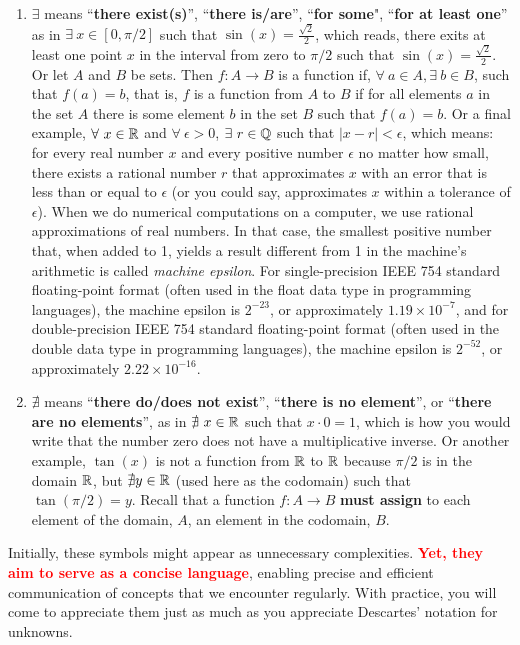 \begin{tcolorbox}[colback = mylightblue, title=\textbf{(Optional Read:) Symbology of Mathematics:}, breakable]
\begin{definition}
\begin{enumerate}
        \item  $\exists$ means ``\textbf{there exist(s)}'', ``\textbf{there is/are}'', ``\textbf{for some}", ``\textbf{for at least one}'' as in $\exists ~x\in [0, \pi/2]$ such that $\sin(x) = \frac{\sqrt{2}}{2}$, which reads, there exits at least one point $x$ in the interval from zero to $\pi/2$ such that $\sin(x) = \frac{\sqrt{2}}{2}$. Or let $A$ and $B$ be sets. Then $f:A \to B$ is a function if, $\forall ~a \in A, \exists~b \in B$, such that $f(a) = b$, that is, $f$ is a function from $A$ to $B$ if for all elements $a$ in the set $A$ there is some element $b$ in the set $ B$ such that $f(a) = b$. Or a final example, $\forall~x \in \mathbb R$ and $\forall~\epsilon > 0$, $\exists~ r \in \mathbb Q$ such that $|x-r| < \epsilon$, which means: for every real number $x$ and every positive number $\epsilon$ no matter how small, there exists a rational number $r$ that approximates $x$ with an error that is less than or equal to $\epsilon$ (or you could say, approximates $x$ within a tolerance of $\epsilon$). When we do numerical computations on a computer, we use rational approximations of real numbers. In that case, the smallest positive number that, when added to 1, yields a result different from 1 in the machine's arithmetic is called \textit{machine epsilon}. For single-precision IEEE 754 standard floating-point format (often used in the float data type in programming languages), the machine epsilon is $ 2^{-23}$, or approximately $1.19 \times 10^{-7}$, and for double-precision IEEE 754 standard floating-point format (often used in the double data type in programming languages), the machine epsilon is $ 2^{-52}$, or approximately $2.22 \times 10^{-16}$.

        \item $\nexists$ means ``\textbf{there do/does not exist}'', ``\textbf{there is no element}'', or ``\textbf{there are no elements}'', as in $\nexists ~x\in \mathbb R$ such that $x \cdot 0 = 1$, which is how you would write that the number zero does not have a multiplicative inverse.  Or another example, $\tan(x)$ is not a function from $\mathbb R$ to $\mathbb R$ because $\pi/2$ is in the domain $\mathbb R$, but $\nexists y \in \mathbb R$ (used here as the codomain) such that $\tan(\pi/2) = y$. Recall that a function $f:A \to B$ \textbf{must assign} to each element of the domain, $A$, an element in the codomain, $B$. 
    
\end{enumerate}
\end{definition}

Initially, these symbols might appear as unnecessary complexities. \textcolor{red}{\bf Yet, they aim to serve as a concise language}, enabling precise and efficient communication of concepts that we encounter regularly. With practice, you will come to appreciate them just as much as you appreciate Descartes' notation for unknowns. 

\end{tcolorbox}

